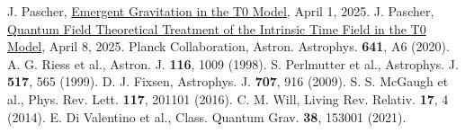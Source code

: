 \documentclass[twocolumn,aps,prl]{revtex4-2}
\begin{document}
\begin{thebibliography}{99}
		 J. Pascher, \href{https://github.com/jpascher/T0-Time-Mass-Duality/tree/main/2/pdf/English/Emergente Gravitation im T0-Modell Eine formale Herleitung_en.pdf}{Emergent Gravitation in the T0 Model}, April 1, 2025.
		 J. Pascher, \href{https://github.com/jpascher/T0-Time-Mass-Duality/tree/main/2/pdf/English/Quantenfeldtheoretische Behandlung des intrinsischen Zeitfelds im T0-Modell_en.pdf}{Quantum Field Theoretical Treatment of the Intrinsic Time Field in the T0 Model}, April 8, 2025.
		 Planck Collaboration, Astron. Astrophys. \textbf{641}, A6 (2020).
		 A. G. Riess et al., Astron. J. \textbf{116}, 1009 (1998).
		 S. Perlmutter et al., Astrophys. J. \textbf{517}, 565 (1999).
		 D. J. Fixsen, Astrophys. J. \textbf{707}, 916 (2009).
		 S. S. McGaugh et al., Phys. Rev. Lett. \textbf{117}, 201101 (2016).
		 C. M. Will, Living Rev. Relativ. \textbf{17}, 4 (2014).
		 E. Di Valentino et al., Class. Quantum Grav. \textbf{38}, 153001 (2021).
	\end{thebibliography}
	
\end{document}

